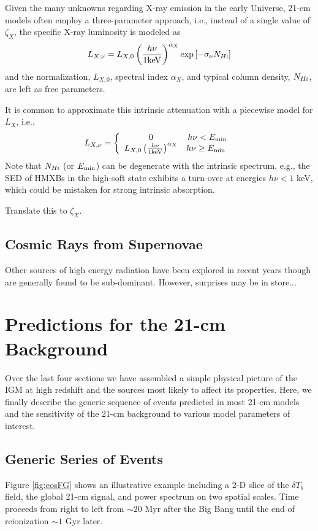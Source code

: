 Given the many unknowns regarding X-ray emission in the early Universe, 21-cm models often employ a three-parameter approach, i.e., instead of a single value of $\zeta_X$, the specific X-ray luminosity is modeled as 
\begin{equation}
	L_{X,\nu} = L_{X,0} \left(\frac{h \nu}{1 \mathrm{keV}} \right)^{\alpha_X} \exp\left[-\sigma_{\nu} N_{H\textsc{i}} \right]
\end{equation}
and the normalization, $L_{X,0}$, spectral index $\alpha_X$, and typical column density, $N_{H\textsc{i}}$, are left as free parameters. 

It is common to approximate this intrinsic attenuation with a piecewise model for $L_X$, i.e., 
\begin{align}
L_{X,\nu} = \left\{ \begin{array}{cc} 
                0 & h\nu < E_{\min} \\
                L_{X,0} \left(\frac{h \nu}{1 \mathrm{keV}} \right)^{\alpha_X} & h\nu \geq E_{\min} \
                \end{array} \right.
\end{align}
Note that $N_{H\textsc{i}}$ (or $E_{\min}$) can be degenerate with the intrinsic spectrum, e.g., the SED of HMXBs in the high-soft state exhibits a turn-over at energies $h\nu < 1$ keV, which could be mistaken for strong intrinsic absorption.

{\color{red} Translate this to $\zeta_X$.}


\subsection{Cosmic Rays from Supernovae}
{\color{red} Other sources of high energy radiation have been explored in recent years though are generally found to be sub-dominant. However, surprises may be in store...}

\section{Predictions for the 21-cm Background} \label{sec:predictions}
Over the last four sections we have assembled a simple physical picture of the IGM at high redshift and the sources most likely to affect its properties. Here, we finally describe the generic sequence of events predicted in most 21-cm models and the sensitivity of the 21-cm background to various model parameters of interest. 

\subsection{Generic Series of Events}
Figure \ref{fig:eosFG} shows an illustrative example including a 2-D slice of the $\delta T_b$ field, the global 21-cm signal, and power spectrum on two spatial scales. Time proceeds from right to left from $\sim 20$ Myr after the Big Bang until the end of reionization $\sim 1$ Gyr later.

